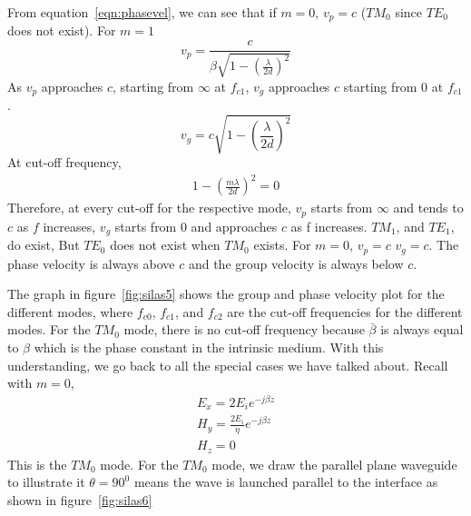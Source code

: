From equation~\ref{eqn:phasevel}, we can see that if $m=0$, $v_{p} =c$ ($TM_0$ since $TE_0$ does not exist). For $m=1$
\begin{equation*}
v_{p}= \frac{c}{\beta \sqrt{1- \left(\frac{\lambda}{2d}\right)^{2}}}
\end{equation*}
As $v_{p}$ approaches $c$, starting from $\infty$ at $f_{c1}$, $v_{g}$ approaches $c$ starting from 0 at $f_{c1}$.
\begin{equation*}
v_{g}= c\sqrt{1-\left(\frac{\lambda}{2d}\right)^{2}}
\end{equation*}
At cut-off frequency, 
\begin{align*}
1-\left(\frac{m\lambda}{2d}\right)^{2} = 0
\end{align*}
Therefore, at every cut-off for the respective mode, $v_{p}$ starts from $\infty$ and tends to $c$ as $f$ increases, $v_{g}$ starts from 0 and approaches $c$ as f increases. $TM_{1}$, and $TE_{1}$, do exist, But $TE_0$ does not exist when $TM_0$ exists. For $m = 0$, $v_{p}=c$ $v_{g}=c$. The phase velocity is always above $c$ and the group velocity is always below $c$.

The graph in figure~\ref{fig:silas5} shows the group and phase velocity plot for the different modes, where $f_{c0}$, $f_{c1}$, and $f_{c2}$ are the cut-off frequencies for the different modes. For the $TM_0$ mode, there is no cut-off frequency because $\bar{\beta}$ is always equal to $\beta$ which is the phase constant in the intrinsic medium. With this understanding, we go back to all the special cases we have talked about. Recall with $m = 0$, 
\begin{align*}
E_{x} =2E_{i} e^{-j\beta z}\\
H_{y} = \frac{2E_{i}}{\eta} e^{-j\beta z}\\
H_{z} =0
\end{align*}
This is the $TM_0$ mode. For the $TM_0$ mode, we draw the parallel plane waveguide to illustrate it $\theta =90^{0}$ means the wave is launched parallel to the interface as shown in figure~\ref{fig:silas6}

